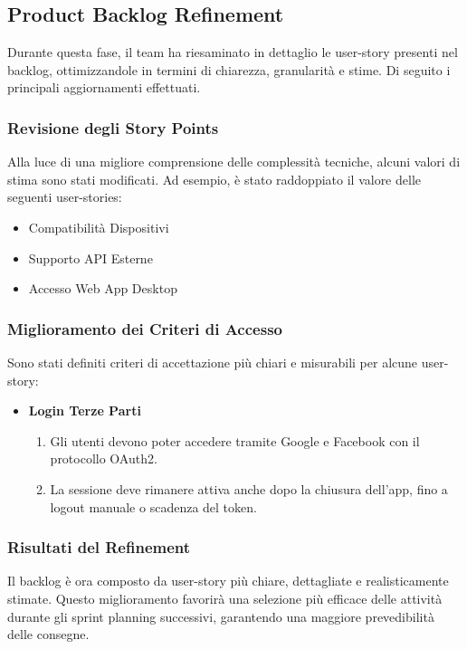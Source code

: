 \subsection{Product Backlog Refinement}

Durante questa fase, il team ha riesaminato in dettaglio le user-story presenti nel backlog, ottimizzandole in termini di chiarezza, granularità e stime. Di seguito i principali aggiornamenti effettuati.

\subsubsection{Revisione degli Story Points}
Alla luce di una migliore comprensione delle complessità tecniche, alcuni valori di stima sono stati modificati. Ad esempio, è stato raddoppiato il valore delle seguenti user-stories:
\begin{itemize}
    \item Compatibilità Dispositivi
    \item Supporto API Esterne
    \item Accesso Web App Desktop
\end{itemize}

\subsubsection{Miglioramento dei Criteri di Accesso} 
Sono stati definiti criteri di accettazione più chiari e misurabili per alcune user-story:
\begin{itemize}
    \item \textbf{Login Terze Parti}
    \begin{enumerate}
        \item Gli utenti devono poter accedere tramite Google e Facebook con il protocollo OAuth2.
        \item La sessione deve rimanere attiva anche dopo la chiusura dell'app, fino a logout manuale o scadenza del token.
    \end{enumerate}
\end{itemize}

\subsubsection{Risultati del Refinement}
Il backlog è ora composto da user-story più chiare, dettagliate e realisticamente stimate. Questo miglioramento favorirà una selezione più efficace delle attività durante gli sprint planning successivi, garantendo una maggiore prevedibilità delle consegne.


